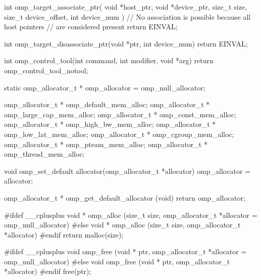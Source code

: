 {\begin{ompcFunction}
int omp_target_associate_ptr(
  void *host_ptr,
  void *device_ptr,
  size_t size,
  size_t device_offset,
  int device_num
)
{
  // No association is possible because all host pointers
  // are considered present
  return EINVAL;
}

int omp_target_disassociate_ptr(void *ptr, int device_num)
{
  return EINVAL;
}


int omp_control_tool(int command, int modifier, void *arg)
{
  return omp_control_tool_notool;
}

static omp_allocator_t * omp_allocator = omp_null_allocator;

omp_allocator_t * omp_default_mem_alloc;
omp_allocator_t * omp_large_cap_mem_alloc;
omp_allocator_t * omp_const_mem_alloc;
omp_allocator_t * omp_high_bw_mem_alloc;
omp_allocator_t * omp_low_lat_mem_alloc;
omp_allocator_t * omp_cgroup_mem_alloc;
omp_allocator_t * omp_pteam_mem_alloc;
omp_allocator_t * omp_thread_mem_alloc;

void omp_set_default allocator(omp_allocator_t *allocator)
{
  omp_allocator = allocator;
}

omp_allocator_t * omp_get_default_allocator (void)
{
  return omp_allocator;
}

#ifdef __cplusplus
void * omp_alloc (size_t size, omp_allocator_t *allocator = omp_null_allocator)
#else
void * omp_alloc (size_t size, omp_allocator_t *allocator)
#endif
{
  return malloc(size);
}

#ifdef __cplusplus
void omp_free (void * ptr, omp_allocator_t *allocator = omp_null_allocator)
#else
void omp_free (void * ptr, omp_allocator_t *allocator)
#endif
{
  free(ptr);
}

\end{ompcFunction}} %

